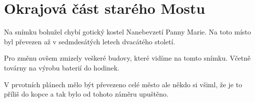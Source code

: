 
\chapter{Okrajová část starého Mostu}

Na snímku bohužel chybí gotický kostel Nanebevzetí Panny Marie. Na toto místo
byl převezen až v sedmdesátých letech dvacátého století.

Pro změnu ovšem zmizely veškeré budovy, které vidíme na tomto snímku.
Včetně továrny na výrobu baterií do hodinek.

V prvotních plánech mělo být převezeno celé město ale někdo si všiml,
že je to příliš do kopce a tak bylo od tohoto záměru upuštěno.

